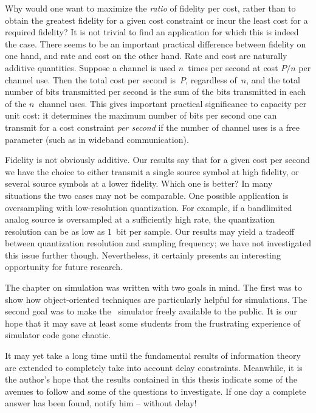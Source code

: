 Why would one want to maximize the \emph{ratio} of fidelity per cost, rather
than to obtain the greatest fidelity for a given cost constraint or incur the
least cost for a required fidelity? It is not trivial to find an application for
which this is indeed the case. There seems to be an important practical
difference between fidelity on one hand, and rate and cost on the other hand.
Rate and cost are naturally additive quantities. Suppose a channel is used
$n$~times per second at cost $P/n$ per channel use. Then the total cost per
second is~$P$, regardless of~$n$, and the total number of bits transmitted per
second is the sum of the bits transmitted in each of the $n$~channel uses. This
gives important practical significance to capacity per unit cost: it determines
the maximum number of bits per second one can transmit for a cost constraint
\emph{per second} if the number of channel uses is a free parameter (such as in
wideband communication). 

Fidelity is not obviously additive. Our results say that for a given cost per
second we have the choice to either transmit a single source symbol at high
fidelity, or several source symbols at a lower fidelity.  Which one is
better? In many situations the two cases may not be comparable. One possible
application is oversampling with low-resolution quantization.  For example, if a
bandlimited analog source is oversampled at a sufficiently high rate, the
quantization resolution can be as low as $1$~bit per sample. Our
results may yield a tradeoff between quantization resolution and sampling
frequency; we have not investigated this issue further though.  Nevertheless, it
certainly presents an interesting opportunity for future research. 

\medbreak

The chapter on simulation was written with two goals in mind. The first was to
show how object-oriented techniques are particularly helpful for simulations.
The second goal was to make the \jscsim\ simulator freely available to the
public. It is our hope that it may save at least some students from the
frustrating experience of simulator code gone chaotic. 

\medbreak

It may yet take a long time until the fundamental results of information theory
are extended to completely take into account delay constraints. Meanwhile, it is
the author's hope that the results contained in this thesis indicate some of the
avenues to follow and some of the questions to investigate. If one day a
complete answer has been found, notify him -- without delay!

